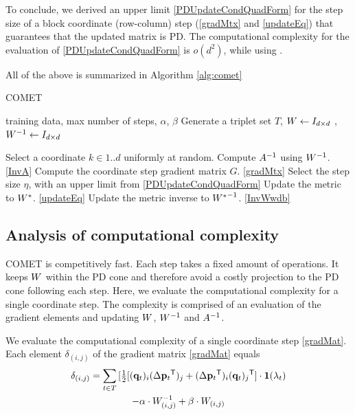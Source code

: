 \documentclass{article}
\begin{document}
{To conclude, we derived an upper limit \eqref{PDUpdateCondQuadForm}
for the step size of a block coordinate (row-column) step
(\eqref{gradMtx} and \eqref{updateEq}) that guarantees that the
updated matrix is PD. The computational complexity for the evaluation
of \eqref{PDUpdateCondQuadForm} is $o(d^2)$, while using .


All of the above is summarized in Algorithm \ref{alg:comet}

\begin{algorithm}[tb]
   \caption{COMET}
   \label{alg:comet}
\begin{algorithmic}[1]
    training data, max number of steps, $\alpha$, $\beta$
   \STATE Generate a triplet set $T$, ${W}  \leftarrow I_{d \times d}$ , ${W}^{-1}  \leftarrow I_{d \times d}$

   \REPEAT 
   \STATE Select a coordinate $k \in {1..d}$ uniformly at random.
   \STATE Compute ${A}^{-1}$ using ${W}^{-1}$. \eqref{InvA}
   \STATE Compute the coordinate step gradient matrix $G$. \eqref{gradMtx}
   \STATE Select the step size $\eta$, with an upper limit from \eqref{PDUpdateCondQuadForm}
   \STATE Update the metric to ${{W^*}}$. \eqref{updateEq}
   \STATE Update the metric inverse to ${{W^*}}^{-1}$. \eqref{InvWwdb}
\end{algorithmic}
\end{algorithm}



\subsection{Analysis of computational complexity}
COMET is competitively fast. Each step takes a fixed amount of operations. It keeps ${W}$ within the PD cone and therefore avoid a costly projection to the PD cone following each step. Here, we evaluate the computational complexity for a single coordinate step. The complexity is comprised of an evaluation of the gradient elements and updating ${W}$, ${W}^{-1}$ and ${A}^{-1}$.

We evaluate the computational complexity of a single coordinate step \eqref{gradMat}. Each element $\delta_{(i,j)}$ of the gradient matrix \eqref{gradMat} equals
\begin{multline}
\delta_{(i,j)} = \sum\limits_{t\in T}{ [\tfrac{1}{2}[(\mathbf{q}_{t})_i(\Delta\mathbf{p}_{t}{}^\mathsf{T})_j + (\Delta\mathbf{p}_{t}{}^\mathsf{T})_i(\mathbf{q}_{t})_j{}^\mathsf{T}] } \cdot \textbf{1}(\lambda_t)  \\ 
 - \alpha \cdot {W}^{-1}_{(i,j)} + \beta \cdot {W}_{(i,j)}
\label{gradMatElem}
\end{multline}

}
\end{document}
